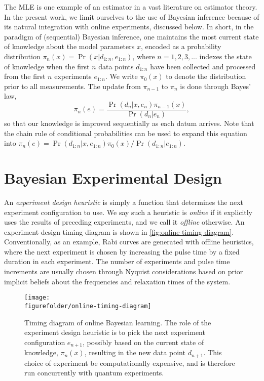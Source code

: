\documentclass[aps,nofootinbib,twocolumn,superscriptaddress]{revtex4}
\newcommand{\figurefolder}{../fig}
\newcommand{\mps}{x}
\newcommand{\eps}{e}
\newcommand{\data}{d}
\begin{document}
The MLE is one example of an estimator in a vast literature on estimator theory.
In the present work, we limit ourselves to the use of Bayesian inference because of its
natural integration with online experiments, discussed below.
In short, in the paradigm of (sequential) Bayesian inference, one maintains the most current state of knowledge about the model parameters $\mps$, encoded
as a probability distribution $\pi_n(\mps)=\Pr(\mps|\data_{1:n},\eps_{1:n})$,
where $n=1,2,3,...$ indexes the state of knowledge when the first $n$ data
points $\data_{1:n}$ have been collected and processed from the
first $n$ experiments $\eps_{1:n}$.
We write $\pi_0(x)$ to denote the distribution prior to all measurements.
The update from $\pi_{n-1}$ to $\pi_n$ is done through Bayes' law,
\begin{equation}
    \pi_n(\eps)
        = \frac{
            \Pr(\data_n|\mps,\eps_n)\pi_{n-1}(\mps)
        }{
            \Pr(\data_n|\eps_n)
        },
\end{equation}
so that our knowledge is improved sequentially as each datum arrives.
Note that the chain rule of conditional probabilities can be used to expand
this equation into
$\pi_n(\eps)=\Pr(\data_{1:n}|\mps,\eps_{1:n})\pi_0(\mps)/\Pr(\data_{1:n}|\eps_{1:n})$.

\section{Bayesian Experimental Design}
\label{sec:experimental-design}

An \textit{experiment design heuristic} is simply a function that
determines the next experiment configuration to use.
We say such a heuristic is \textit{online} if it explicitly uses the
results of preceding experiments, and we call it \textit{offline}
otherwise.
An experiment design timing diagram is shown in \autoref{fig:online-timing-diagram}.
Conventionally, as an example, Rabi curves are generated
with offline heuristics, where the next experiment is chosen by
increasing the pulse time by a fixed duration in each experiment.
The number of experiments and pulse time increments are usually
chosen through Nyquist considerations based on prior implicit
beliefs about the frequencies and relaxation times of the system.

\begin{figure*}
    \texttt{[image: \\figurefolder/online-timing-diagram]}
    \caption{Timing diagram of online Bayesian learning. The role of the
    experiment design heuristic is to pick the next experiment configuration
    $e_{n+1}$, possibly based
    on the current state of knowledge, $\pi_n(\mps)$, resulting in the
    new data point $d_{n+1}$.
    This choice of experiment be computationally expensive, and is
    therefore run concurrently with quantum experiments.}
    \label{fig:online-timing-diagram}
\end{figure*}
\end{document}
